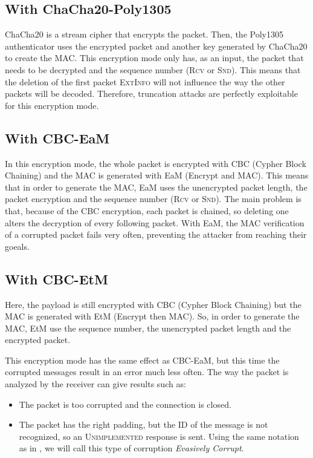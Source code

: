 \documentclass[journal=tches,final]{iacrtrans}
\begin{document}
\subsection{With ChaCha20-Poly1305}
\label{sec:prefix-truncation-ChaCha20-Poly1305}

ChaCha20 is a stream cipher that encrypts the packet. Then, the Poly1305 authenticator uses the encrypted packet and another key generated by ChaCha20 to create the MAC. This encryption mode only has, as an input, the packet that needs to be decrypted and the sequence number (\textsc{Rcv} or \textsc{Snd}). \cite{ChaCha20-Poly1305-for-IETF-Protocols} \cite{terrapin-attack} This means that the deletion of the first packet \textsc{ExtInfo} will not influence the way the other packets will be decoded. Therefore, truncation attacks are perfectly exploitable for this encryption mode.


\subsection{With CBC-EaM}
\label{sec:prefix-truncation-CBC-EaM}

In this encryption mode, the whole packet is encrypted with CBC (Cypher Block Chaining) and the MAC is generated with EaM (Encrypt and MAC). This means that in order to generate the MAC, EaM uses the unencrypted packet length, the packet encryption and the sequence number (\textsc{Rcv} or \textsc{Snd}). The main problem is that, because of the CBC encryption, each packet is chained, so deleting one alters the decryption of every following packet. With EaM, the MAC verification of a corrupted packet fails very often, preventing the attacker from reaching their goeals.

\subsection{With CBC-EtM}
\label{sec:prefix-truncation-CBC-EtM}

Here, the payload is still encrypted with CBC (Cypher Block Chaining) but the MAC is generated with EtM (Encrypt then MAC). So, in order to generate the MAC, EtM use the sequence number, the unencrypted packet length and the encrypted packet.

This encryption mode has the same effect as CBC-EaM, but this time the corrupted messages result in an error much less often. The way the packet is analyzed by the receiver can give results such as:

\begin{itemize}
    \item The packet is too corrupted and the connection is closed.
    \item The packet has the right padding, but the ID of the message is not recognized, so an \textsc{Unimplemented} response is sent. Using the same notation as in \cite{terrapin-attack}, we will call this type of corruption \textit{Evasively Corrupt}.
\end{itemize}
\end{document}
